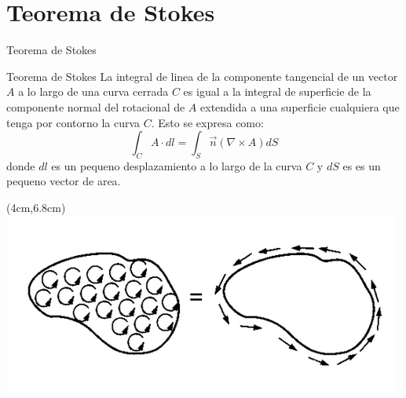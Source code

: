 \documentclass [xcolor=svgnames, t] {beamer}
\begin{document}
\section{Teorema de Stokes}
\begin{frame}{Teorema de Stokes}
\begin{block}{Teorema de Stokes}
La integral de linea de la componente tangencial de un vector $A$ a lo largo de una curva cerrada $C$ es igual a la integral de superficie de la componente normal del rotacional de $A$ extendida a una superficie cualquiera que tenga por contorno la curva $C$. Esto se expresa como:
\begin{equation}
\int_C A \cdot dl = \int_S \vec{n}(\nabla \times A)dS
\label{tst}
\end{equation}
donde $dl$ es un pequeno desplazamiento a lo largo de la curva $C$ y $dS$ es es un pequeno vector de area.
\end{block}
\begin{textblock*}{5cm}(4cm,6.8cm) %
\includegraphics[width=\textwidth]{sto}
\end{textblock*}
\end{frame}
\end{document}
